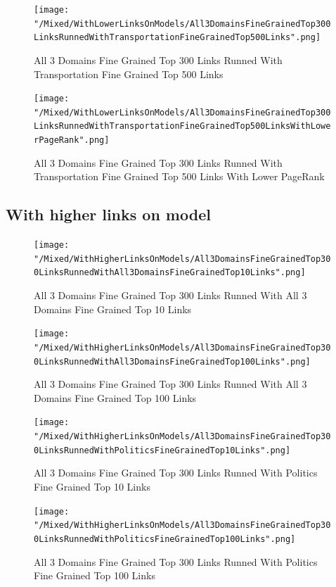 \documentclass[thesis=M,english]{FITthesis}[2018/05/30]
\begin{document}
	\begin{figure}[H]\centering
		\texttt{[image: "/Mixed/WithLowerLinksOnModels/All3DomainsFineGrainedTop300LinksRunnedWithTransportationFineGrainedTop500Links".png]}
		\caption{All 3 Domains Fine Grained Top 300 Links Runned With Transportation Fine Grained Top 500 Links}\label{}
	\end{figure}
	
	\begin{figure}[H]\centering
		\texttt{[image: "/Mixed/WithLowerLinksOnModels/All3DomainsFineGrainedTop300LinksRunnedWithTransportationFineGrainedTop500LinksWithLowerPageRank".png]}
		\caption{All 3 Domains Fine Grained Top 300 Links Runned With Transportation Fine Grained Top 500 Links With Lower PageRank}\label{}
	\end{figure}
\subsection{With higher links on model}	
	\begin{figure}[!htb]\centering
		\texttt{[image: "/Mixed/WithHigherLinksOnModels/All3DomainsFineGrainedTop300LinksRunnedWithAll3DomainsFineGrainedTop10Links".png]}
		\caption{All 3 Domains Fine Grained Top 300 Links Runned With All 3 Domains Fine Grained Top 10 Links}\label{}
	\end{figure}
	
	\begin{figure}[H]\centering
		\texttt{[image: "/Mixed/WithHigherLinksOnModels/All3DomainsFineGrainedTop300LinksRunnedWithAll3DomainsFineGrainedTop100Links".png]}
		\caption{All 3 Domains Fine Grained Top 300 Links Runned With All 3 Domains Fine Grained Top 100 Links}\label{}
	\end{figure}
	
	\begin{figure}[H]\centering
		\texttt{[image: "/Mixed/WithHigherLinksOnModels/All3DomainsFineGrainedTop300LinksRunnedWithPoliticsFineGrainedTop10Links".png]}
		\caption{All 3 Domains Fine Grained Top 300 Links Runned With Politics Fine Grained Top 10 Links}\label{}
	\end{figure}
		
	\begin{figure}[H]\centering
		\texttt{[image: "/Mixed/WithHigherLinksOnModels/All3DomainsFineGrainedTop300LinksRunnedWithPoliticsFineGrainedTop100Links".png]}
		\caption{All 3 Domains Fine Grained Top 300 Links Runned With Politics Fine Grained Top 100 Links}\label{}
	\end{figure}
	
\end{document}
